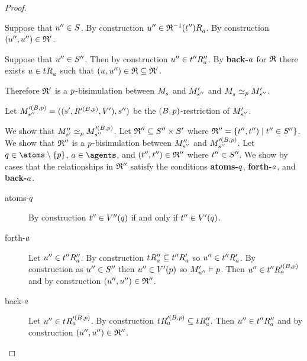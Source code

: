 \begin{proof}
\begin{description}
\begin{description}
                Suppose that $\kStateUPP \in \kStates$.
                By construction $\kStateUPP \in \kSuccessorsA{\refinement^{-1}(\kStateTPP)}$.
                By construction $(\kStateUPP, \kStateUPP) \in \bisimulation'$.

                Suppose that $\kStateUPP \in \kStatesPP$.
                Then by construction $\kStateUPP \in \kSuccessorsPPA{\kStateTPP}$.
                By {\bf back-$\agentA$} for $\refinement$ there exists $\kStateU \in \kSuccessorsA{\kStateT}$ such that $(\kStateU, \kStateUPP) \in \refinement \subseteq \bisimulation'$.
        \end{description}
\end{description}

Therefore $\bisimulation'$ is a $\atomP$-bisimulation between $\kPModel{\kStateS}$ and $\kPModelP{\kStateSPP}$ and $\kPModel{\kStateS} \bisimilar[\atomP] \kPModelP{\kStateSPP}$.

Let $\kPModel[\prime(\agentsB, \atomP)]{\kStateSPP} = ((\kStateSP, \kAccessibility[\prime(\agentsB, \atomP)]{}, \kValuationP), \kStateSPP)$ be the $(\agentsB, \atomP)$-restriction of $\kPModelP{\kStateSPP}$.

We show that $\kPModelPP{\kStateSP} \bisimilar[\atomP] \kPModel[\prime(\agentsB, \atomP)]{\kStateSPP}$.
Let $\bisimulation'' \subseteq \kStatesPP \times \kStatesP$ where $\bisimulation'' = \{\kStateTPP, \kStateTPP) \mid \kStateTPP \in \kStatesPP\}$.
We show that $\bisimulation''$ is a $\atomP$-bisimulation between $\kPModelPP{\kStateSPP}$ and $\kPModel[\prime(\agentsB, \atomP)]{\kStateSPP}$.
Let $\atomQ \in \atoms \setminus \{\atomP\}$, $\agentA \in \agents$, and $(\kStateTPP, \kStateTPP) \in \bisimulation''$ where $\kStateTPP \in \kStatesPP$.
We show by cases that the relationships in $\bisimulation''$ satisfy the conditions {\bf atoms-$\atomQ$}, {\bf forth-$\agentA$}, and {\bf back-$\agentA$}.

\begin{description}
    \item[atoms-$\atomQ$] 
        By construction $\kStateTPP \in \kValuationPP(\atomQ)$ if and only if $\kStateTPP \in \kValuationP(\atomQ)$.
    \item[forth-$\agentA$]
        Let $\kStateUPP \in \kSuccessorsPPA{\kStateTPP}$.
        By construction $\kSuccessorsPPA{\kStateT} \subseteq \kSuccessorsPA{\kStateTPP}$ so $\kStateUPP \in \kSuccessorsPA{\kStateTPP}$.
        By construction as $\kStateUPP \in \kStatesPP$ then $\kStateUPP \in \kValuationP(\atomP)$ so $\kPModelP{\kStateUPP} \entails \atomP$.
        Then $\kStateUPP \in \kSuccessorsA[\prime(\agentsB, \atomP)]{\kStateTPP}$ and by construction $(\kStateUPP, \kStateUPP) \in \bisimulation''$.
    \item[back-$\agentA$]
        Let $\kStateUPP \in \kSuccessorsA[\prime(\agentsB, \atomP)]{\kStateT}$.
        By construction $\kSuccessorsA[\prime(\agentsB, \atomP)]{\kStateT} \subseteq \kSuccessorsPPA{\kStateT}$.
        Then $\kStateUPP \in \kSuccessorsPPA{\kStateTPP}$ and by construction $(\kStateUPP, \kStateUPP) \in \bisimulation''$.
\end{description}


\end{proof}
